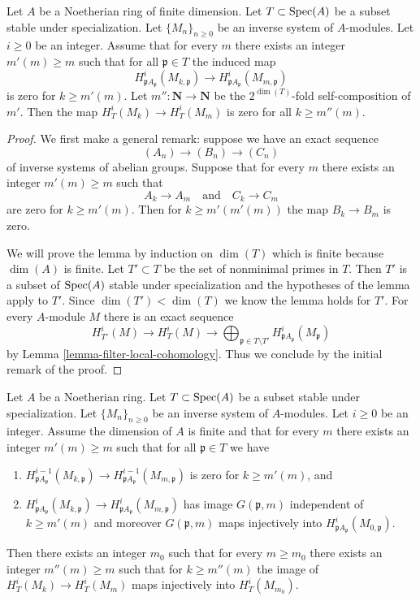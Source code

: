 \begin{lemma}
\label{lemma-zero}
Let $A$ be a Noetherian ring of finite dimension.
Let $T \subset \mathop{\mathrm{Spec}}(A)$ be a subset stable under specialization.
Let $\{M_n\}_{n \geq 0}$ be an inverse system of $A$-modules.
Let $i \geq 0$ be an integer. Assume that for every $m$ there
exists an integer $m'(m) \geq m$ such  that for all
$\mathfrak p \in T$ the induced map
$$
H^i_{\mathfrak p A_\mathfrak p}(M_{k, \mathfrak p})
\longrightarrow
H^i_{\mathfrak p A_\mathfrak p}(M_{m, \mathfrak p})
$$
is zero for $k \geq m'(m)$. Let $m'' : \mathbf{N} \to \mathbf{N}$
be the $2^{\dim(T)}$-fold self-composition of $m'$. Then the map
$H^i_T(M_k) \to H^i_T(M_m)$ is zero for all $k \geq m''(m)$.
\end{lemma}

\begin{proof}
We first make a general remark: suppose we have an exact
sequence
$$
(A_n) \to (B_n) \to (C_n)
$$
of inverse systems of abelian groups. Suppose that for every
$m$ there exists an integer $m'(m) \geq m$ such that
$$
A_k \to A_m
\quad\text{and}\quad
C_k \to C_m
$$
are zero for $k \geq m'(m)$. Then for $k \geq m'(m'(m))$
the map $B_k \to B_m$ is zero.

\medskip\noindent
We will prove the lemma by induction on $\dim(T)$ which is
finite because $\dim(A)$ is finite. Let $T' \subset T$ be
the set of nonminimal primes in $T$. Then $T'$
is a subset of $\mathop{\mathrm{Spec}}(A)$ stable under specialization
and the hypotheses of the lemma apply to $T'$.
Since $\dim(T') < \dim(T)$ we know the lemma holds for $T'$.
For every $A$-module $M$ there is an exact sequence
$$
H^i_{T'}(M) \to H^i_T(M) \to
\bigoplus\nolimits_{\mathfrak p \in T \setminus T'}
H^i_{\mathfrak p A_\mathfrak p}(M_\mathfrak p)
$$
by Lemma \ref{lemma-filter-local-cohomology}.
Thus we conclude by the initial remark of the proof.
\end{proof}

\begin{lemma}
\label{lemma-essential-image}
Let $A$ be a Noetherian ring. Let $T \subset \mathop{\mathrm{Spec}}(A)$ be a subset
stable under specialization. Let $\{M_n\}_{n \geq 0}$ be an inverse system
of $A$-modules. Let $i \geq 0$ be an integer. Assume the dimension of $A$
is finite and that for every $m$ there exists an integer $m'(m) \geq m$
such that for all $\mathfrak p \in T$ we have
\begin{enumerate}
\item $H^{i - 1}_{\mathfrak p A_\mathfrak p}(M_{k, \mathfrak p})
\to H^{i - 1}_{\mathfrak p A_\mathfrak p}(M_{m, \mathfrak p})$
is zero for $k \geq m'(m)$, and
\item $ H^i_{\mathfrak p A_\mathfrak p}(M_{k, \mathfrak p}) \to
H^i_{\mathfrak p A_\mathfrak p}(M_{m, \mathfrak p})$
has image $G(\mathfrak p, m)$ independent of $k \geq m'(m)$ and moreover
$G(\mathfrak p, m)$ maps injectively into
$H^i_{\mathfrak p A_\mathfrak p}(M_{0, \mathfrak p})$.
\end{enumerate}
Then there exists an integer $m_0$ such that for every $m \geq m_0$
there exists an integer $m''(m) \geq m$ such that
for $k \geq m''(m)$ the image of $H^i_T(M_k) \to H^i_T(M_m)$
maps injectively into $H^i_T(M_{m_0})$.
\end{lemma}

